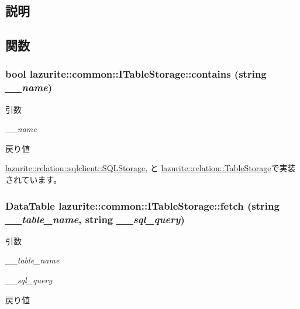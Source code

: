 \subsection{説明}


\subsection{関数}
\hypertarget{interfacelazurite_1_1common_1_1_i_table_storage_a2645db3c1b04ecd4e76f00edaf65ba03}{
\subsubsection[{contains}]{\setlength{\rightskip}{0pt plus 5cm}bool lazurite::common::ITableStorage::contains (string {\em \_\-\_\-name})}}
\label{interfacelazurite_1_1common_1_1_i_table_storage_a2645db3c1b04ecd4e76f00edaf65ba03}

\begin{DoxyParams}{引数}
\item[{\em \_\-\_\-name}]\end{DoxyParams}
\begin{DoxyReturn}{戻り値}

\end{DoxyReturn}


\hyperlink{classlazurite_1_1relation_1_1sqlclient_1_1_s_q_l_storage_a57c78a427b2cb14056772f1239d3b45c}{lazurite::relation::sqlclient::SQLStorage}, と \hyperlink{classlazurite_1_1relation_1_1_table_storage_a5b26c8b4b586befb3131fef66e57116a}{lazurite::relation::TableStorage}で実装されています。\hypertarget{interfacelazurite_1_1common_1_1_i_table_storage_a2607a18e5f7931dfc5ecacbc21f077e3}{
\subsubsection[{fetch}]{\setlength{\rightskip}{0pt plus 5cm}DataTable lazurite::common::ITableStorage::fetch (string {\em \_\-\_\-table\_\-name}, \/  string {\em \_\-\_\-sql\_\-query})}}
\label{interfacelazurite_1_1common_1_1_i_table_storage_a2607a18e5f7931dfc5ecacbc21f077e3}

\begin{DoxyParams}{引数}
\item[{\em \_\-\_\-table\_\-name}]\item[{\em \_\-\_\-sql\_\-query}]\end{DoxyParams}
\begin{DoxyReturn}{戻り値}

\end{DoxyReturn}


